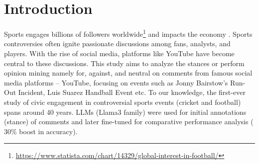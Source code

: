 \documentclass[sigconf, review]{acmart}
\begin{document}


\maketitle

\section{Introduction}


Sports engages billions of followers worldwide\footnote{\url{https://www.statista.com/chart/14329/global-interest-in-football/}} 
and impacts the economy \cite{sportseconomics20221}. Sports controversies often ignite passionate discussions among fans, analysts, and players. With the rise of social media, platforms like YouTube have become central to these discussions. This study aims to analyze the stances or perform opinion mining namely for, against, and neutral on comments from famous social media platforms -- YouTube, focusing on events such as Jonny Bairstow's Run-Out Incident, Luis Suarez Handball Event etc.
To our knowledge, the first-ever study of civic engagement in controversial sports events (cricket and football) spans around 40 years. LLMs (Llama3 family) were used for initial annotations (stance) of comments and later fine-tuned for comparative performance analysis ($~$30\% boost in accuracy).

\end{document}
